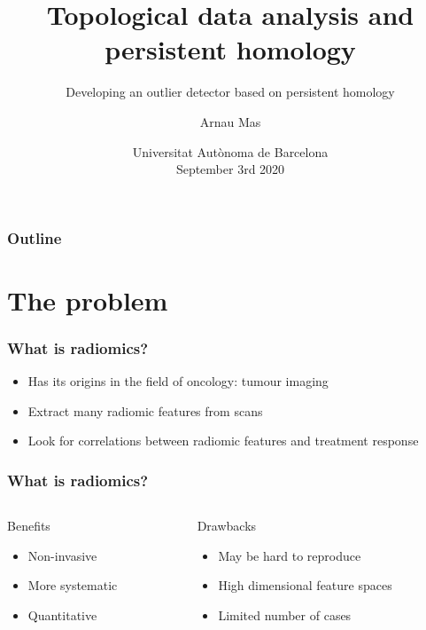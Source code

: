 \documentclass[xcolor=dvipsnames]{beamer}
\title[TDA and persistent homology]{\bfseries{Topological data analysis and persistent
homology}}
\subtitle{Developing an outlier detector based on persistent homology}
\author[Arnau Mas]{Arnau Mas}
\institute[]{\footnotesize{\itshape{Supervised by}} \\ Dr Albert Ruiz}
\date[UAB, Sept 9th 2020]{\small Universitat Autònoma de Barcelona \\ September 3rd 2020}
\begin{document}
\begin{frame}[plain]
	\titlepage
\end{frame}


\AtEndDocument{
	\begin{frame}[plain]
		\titlepage
	\end{frame}
}

\begin{frame}
	\frametitle{Outline}
	\tableofcontents
\end{frame}

\section{The problem}

\begin{frame}
	\frametitle{What is radiomics?}
	\begin{itemize}
		\item Has its origins in the field of oncology: tumour imaging \pause
		\item Extract many \alert{radiomic features} from scans \pause
		\item Look for correlations between radiomic features and treatment response
	\end{itemize}
\end{frame}

\begin{frame}
	\frametitle{What is radiomics?}
	\begin{columns}
		\begin{column}{0.4\textwidth}
			\begin{block}{Benefits}
				\begin{itemize}
					\item Non-invasive
					\item More systematic
					\item Quantitative
				\end{itemize} \pause
			\end{block}		
		\end{column}
		
		\begin{column}{0.4\textwidth}
			\begin{block}{Drawbacks}
				\begin{itemize}
					\item May be hard to reproduce
					\item High dimensional feature spaces
					\item Limited number of cases
				\end{itemize} 
			\end{block}				
		\end{column}
	\end{columns}
\end{frame}
\end{document}
